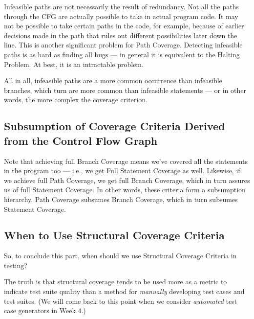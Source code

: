 
Infeasible paths are not necessarily the result of redundancy. Not all the paths
through the CFG are actually possible to take in actual program code.  It may
not be possible to take certain paths in the code, for example, because of
earlier decisions made in the path that rules out different possibilities later
down the line. This is another significant problem for Path Coverage. Detecting
infeasible paths is as hard as finding all bugs --- in general it is equivalent
to the Halting Problem. At best, it is an intractable problem.

All in all, infeasible paths are a more common occurrence than infeasible
branches, which turn are more common than infeasible statements --- or in other
words, the more complex the coverage criterion. 


\subsection{Subsumption of Coverage Criteria Derived from the Control Flow Graph} 


Note that achieving full Branch Coverage means we've covered all the statements
in the program too --- i.e., we get Full Statement Coverage as well. Likewise,
if we achieve full Path Coverage, we get full Branch Coverage, which in turn
assures us of full Statement Coverage. In other words, these criteria form a
subsumption hierarchy. Path Coverage subsumes Branch Coverage, which in turn
subsumes Statement Coverage.


\subsection{When to Use Structural Coverage Criteria} 

So, to conclude this part, when should we use Structural Coverage Criteria in
testing?


The truth is that structural coverage tends to be used more as a metric to
indicate test suite quality than a method for {\it manually} developing test
cases and test suites. (We will come back to this point when we consider {\it
automated} test case generators in Week 4.)

